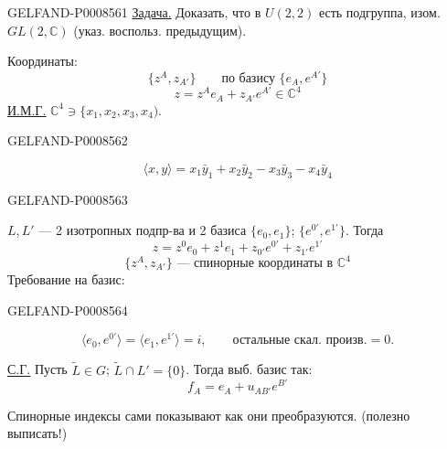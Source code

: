 


\begin{GelfandAdjacentEvidence}{GELFAND-P000856}{1}
\uline{Задача.} Доказать, что в \(U(2,2)\) есть подгруппа, изом. \(GL(2,\mathbb{C})\)
(указ. воспольз. предыдущим).

Координаты:
\[
\{z^A,z_{A'}\}\qquad\text{по базису }\{e_A,e^{A'}\}\tag{10}
\]
\[
z=z^Ae_A+z_{A'}e^{A'}\in\mathbb C^4\tag{11}
\]
\uline{\uline{И.М.Г.}} \(\mathbb C^4\ni\lbrace x_1,x_2,x_3,x_4)\).
\end{GelfandAdjacentEvidence}
\begin{GelfandAdjacentEvidence}{GELFAND-P000856}{2}

\[
\langle x,y\rangle=x_1\bar y_1+x_2\bar y_2-x_3\bar y_3-x_4\bar y_4\tag{12}
\]
\end{GelfandAdjacentEvidence}
\begin{GelfandAdjacentEvidence}{GELFAND-P000856}{3}

\(L,L'\) — 2 изотропных подпр-ва и 2 базиса \(\{e_0,e_1\}\); \(\{e^{0'},e^{1'}\}\).
Тогда
\[
z=z^0e_0+z^1e_1+z_{0'}e^{0'}+z_{1'}e^{1'}\tag{13}
\]
\[
\{z^A,z_{A'}\}\text{ — спинорные координаты в }\mathbb C^4\tag{14}
\]
Требование на базис:
\end{GelfandAdjacentEvidence}
\begin{GelfandAdjacentEvidence}{GELFAND-P000856}{4}

\[
\langle e_0,e^{0'}\rangle=\langle e_1,e^{1'}\rangle=i,
\qquad\text{остальные скал. произв.}=0.\tag{15}
\]

\uline{\uline{С.Г.}} Пусть \(\widetilde L\in G\); \(\widetilde L\cap L'=\{0\}\).
Тогда выб. базис так:
\[
f_A=e_A+u_{AB'}e^{B'}\tag{16}
\]
\end{GelfandAdjacentEvidence}

Спинорные индексы сами показывают как они преобразуются. (полезно выписать!)


